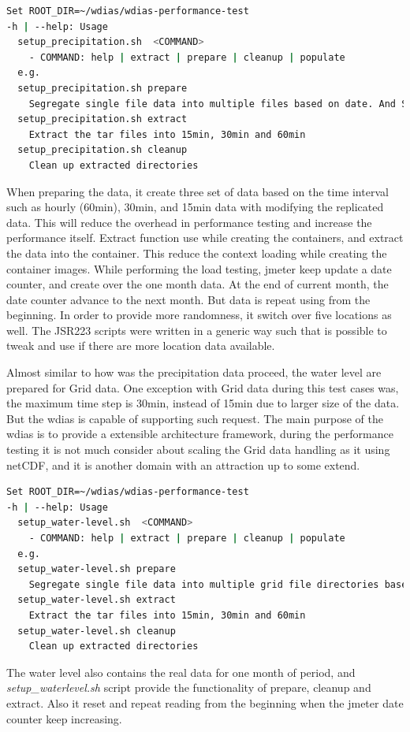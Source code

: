 \begin{lstlisting}[language=sh, caption=Preparation of precipitation data.]
Set ROOT_DIR=~/wdias/wdias-performance-test
-h | --help: Usage
  setup_precipitation.sh  <COMMAND>
    - COMMAND: help | extract | prepare | cleanup | populate
  e.g.
  setup_precipitation.sh prepare
    Segregate single file data into multiple files based on date. And Separate into main directories of 15min, 30min, 60min and create tar files
  setup_precipitation.sh extract
    Extract the tar files into 15min, 30min and 60min
  setup_precipitation.sh cleanup
    Clean up extracted directories
\end{lstlisting}
When preparing the data, it create three set of data based on the time interval such as hourly (60min), 30min, and 15min data with modifying the replicated data.
This will reduce the overhead in performance testing and increase the performance itself.
Extract function use while creating the containers, and extract the data into the container. This reduce the context loading while creating the container images.
While performing the load testing, \acrshort{jmeter} keep update a date counter, and create over the one month data. At the end of current month, the date counter advance to the next month. But data is repeat using from the beginning. In order to provide more randomness, it switch over five locations as well. The JSR223 scripts were written in a generic way such that is possible to tweak and use if there are more location data available.

Almost similar to how was the precipitation data proceed, the water level are prepared for Grid data. One exception with Grid data during this test cases was, the maximum time step is 30min, instead of 15min due to larger size of the data. But the \acrshort{wdias} is capable of supporting such request. The main purpose of the \acrshort{wdias} is to provide a extensible architecture framework, during the performance testing it is not much consider about scaling the Grid data handling as it using \acrshort{netCDF}, and it is another domain with an attraction up to some extend.

\begin{lstlisting}[language=sh, caption= Preparation of water-level data.]
Set ROOT_DIR=~/wdias/wdias-performance-test
-h | --help: Usage
  setup_water-level.sh  <COMMAND>
    - COMMAND: help | extract | prepare | cleanup | populate
  e.g.
  setup_water-level.sh prepare
    Segregate single file data into multiple grid file directories based on date. And Separate into main directories of 15min, 30min, 60min and create tar files
  setup_water-level.sh extract
    Extract the tar files into 15min, 30min and 60min
  setup_water-level.sh cleanup
    Clean up extracted directories
\end{lstlisting}
The water level also contains the real data for one month of period, and \emph{setup\_waterlevel.sh} script provide the functionality of prepare, cleanup and extract.
Also it reset and repeat reading from the beginning when the \acrshort{jmeter} date counter keep increasing.


